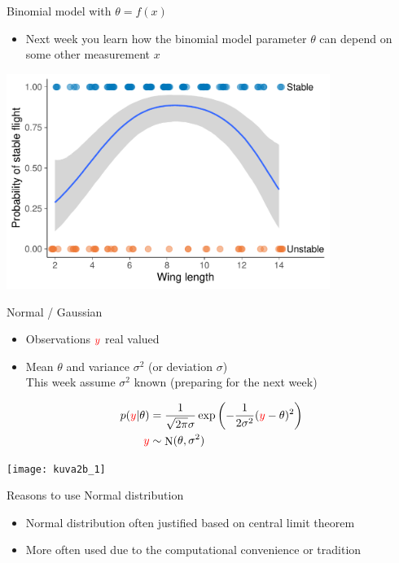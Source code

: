 \documentclass[english,t]{beamer}
\DeclareMathOperator{\N}{N}
\begin{document}
\begin{frame}{Binomial model with $\theta=f(x)$}

  \begin{itemize}
  \item Next week you learn how the binomial model parameter $\theta$
    can depend on some other measurement $x$
  \end{itemize}
  
  \includegraphics[width=10.5cm]{figs/helicopter_stable_brms.pdf}
  
\end{frame}


\begin{frame}{Normal / Gaussian}

  \begin{itemize}
  \item Observations ${\color{red}y}$ real valued
  \item Mean $\theta$ and variance $\sigma^2$ (or deviation $\sigma$)\\
    This week assume $\sigma^2$ known (preparing for the next week)
  \end{itemize}
  \vskip -2mm
  \begin{align*}
    p({\color{red}y}|\theta)&=\frac{1}{\sqrt{2\pi}\sigma}\exp\left(-\frac{1}{2\sigma^2}({\color{red}y}-\theta)^2\right)\\
    {\color{red}y} & \sim \N(\theta,\sigma^2)
  \end{align*}

  \begin{center}
    \texttt{[image: kuva2b\_1]}
  \end{center}
\end{frame}

\begin{frame}{Reasons to use Normal distribution}

  \begin{itemize}
  \item Normal distribution often justified based on central limit theorem
  \item More often used due to the computational convenience or tradition
  \end{itemize}

\end{frame}
\end{document}
